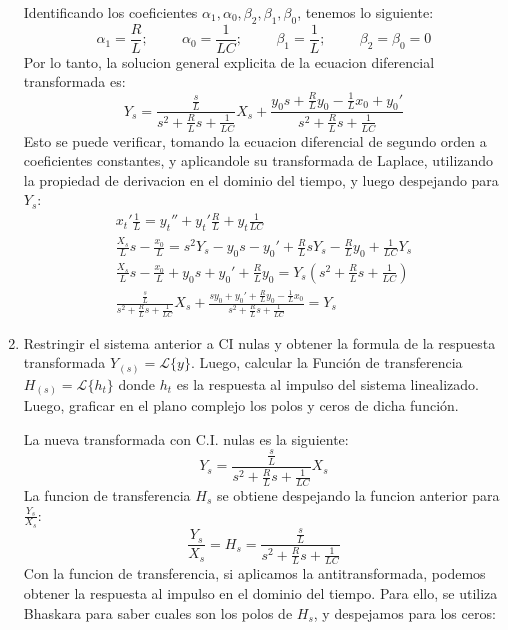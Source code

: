 \documentclass[12pt,a4paper]{report}
\begin{document}
\begin{enumerate}[label=\alph*)]
    Identificando los coeficientes $\alpha_1, \alpha_0, \beta_2, \beta_1, \beta_0$, tenemos lo siguiente:
    \begin{equation*}
      \alpha_1 = \frac{R}{L}; \hspace{1cm}\alpha_0 = \frac{1}{LC}; \hspace{1cm}\beta_1 = \frac{1}{L};
        \hspace{1cm}\beta_2 = \beta_0 = 0
    \end{equation*}
    Por lo tanto, la solucion general explicita de la ecuacion diferencial transformada es:
    \begin{equation*}
      Y_s = \frac{\frac{s}{L}}{s^2 + \frac{R}{L}s + \frac{1}{LC}} X_s + \frac{y_0 s +
        \frac{R}{L} y_0 - \frac{1}{L} x_0 + y_0'}{s^2 + \frac{R}{L}s + \frac{1}{LC}}
    \end{equation*}
    Esto se puede verificar, tomando la ecuacion diferencial de segundo orden a coeficientes constantes, y aplicandole
    su transformada de Laplace, utilizando la propiedad de derivacion en el dominio del tiempo, y luego despejando para
    $Y_s$:
    \begin{gather*}
      x_t' \frac{1}{L} = y_t'' + y_t' \frac{R}{L} + y_t \frac{1}{LC}\\[6pt]
      \frac{X_s}{L}s - \frac{x_0}{L} = s^2 Y_s - y_0 s - y_0' + \frac{R}{L} s Y_s - \frac{R}{L} y_0 +
        \frac{1}{LC} Y_s\\[6pt]
      \frac{X_s}{L}s - \frac{x_0}{L} + y_0 s + y_0' + \frac{R}{L} y_0 = Y_s \left(s^2 + \frac{R}{L} s +
        \frac{1}{LC}\right)\\[6pt]
        \frac{\frac{s}{L}}{s^2 + \frac{R}{L} s + \frac{1}{LC}} X_s + \frac{s y_0 + y_0' + \frac{R}{L} y_0 -
          \frac{1}{L} x_0}{s^2 + \frac{R}{L} s + \frac{1}{LC}} = Y_s
    \end{gather*}

\item Restringir el sistema anterior a CI nulas y obtener la formula de la respuesta transformada $Y_{(s)} = \mathcal{L}\{y\}$.
  Luego, calcular la Función de transferencia $H_{(s)} = \mathcal{L}\{h_t\}$ donde $h_t$ es la respuesta al impulso del sistema
    linealizado. Luego, graficar en el plano complejo los polos y ceros de dicha función.
    
    La nueva transformada con C.I. nulas es la siguiente:
    \begin{equation*}
      Y_s = \frac{\frac{s}{L}}{s^2 + \frac{R}{L} s + \frac{1}{LC}} X_s
    \end{equation*}
    La funcion de transferencia $H_s$ se obtiene despejando la funcion anterior para $\frac{Y_s}{X_s}$:
    \begin{equation*}
      \frac{Y_s}{X_s} = H_s = \frac{\frac{s}{L}}{s^2 + \frac{R}{L} s + \frac{1}{LC}}
    \end{equation*}
    Con la funcion de transferencia, si aplicamos la antitransformada, podemos obtener la respuesta al impulso en el
    dominio del tiempo. Para ello, se utiliza Bhaskara para saber cuales son los polos de $H_s$, y despejamos para los
    ceros:
    

\end{enumerate}
\end{document}
